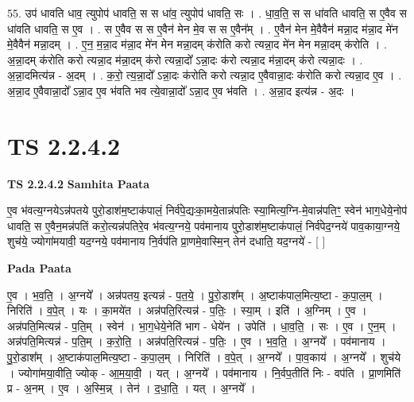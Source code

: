 \documentclass[17pt]{extarticle}
\begin{document}
55. उप॑ धावति धाव॒ त्युपोप॑ धावति॒ स स धा॑व॒ त्युपोप॑ धावति॒ सः । . धा॒व॒ति॒ स स धा॑वति धावति॒ स ए॒वैव स धा॑वति धावति॒ स ए॒व । . स ए॒वैव स स ए॒वैन॑ मेन मे॒व स स ए॒वैन᳚म् । . ए॒वैन॑ मेन मे॒वैवैन॑ मन्ना॒द म॑न्ना॒द मे॑न मे॒वैवैन॑ मन्ना॒दम् । . ए॒न॒ म॒न्ना॒द म॑न्ना॒द मे॑न मेन मन्ना॒दम् क॑रोति करो त्यन्ना॒द मे॑न मेन मन्ना॒दम् क॑रोति । . अ॒न्ना॒दम् क॑रोति करो त्यन्ना॒द म॑न्ना॒दम् क॑रो त्यन्ना॒दो᳚ ऽन्ना॒दः क॑रो त्यन्ना॒द म॑न्ना॒दम् क॑रो त्यन्ना॒दः । . अ॒न्ना॒दमित्य॑न्न - अ॒दम् । . क॒रो॒ त्य॒न्ना॒दो᳚ ऽन्ना॒दः क॑रोति करो त्यन्ना॒द ए॒वैवान्ना॒दः क॑रोति करो त्यन्ना॒द ए॒व । . अ॒न्ना॒द ए॒वैवान्ना॒दो᳚ ऽन्ना॒द ए॒व भ॑वति भव त्ये॒वान्ना॒दो᳚ ऽन्ना॒द ए॒व भ॑वति । . अ॒न्ना॒द इत्य॑न्न - अ॒दः । \newline
\pagebreak
{}
\section*{ TS 2.2.4.2 }

\textbf{TS 2.2.4.2 } \newline
\textbf{Samhita Paata} \newline

ए॒व भ॑वत्य॒ग्नयेऽन्न॑पतये पुरो॒डाश॑म॒ष्टाक॑पालं॒ निर्व॑पे॒द्यःका॒मये॒तान्न॑पतिः स्या॒मित्य॒ग्नि-मे॒वान्न॑पतिꣳ॒॒ स्वेन॑ भाग॒धेये॒नोप॑ धावति॒ स ए॒वैन॒मन्न॑पतिं करो॒त्यन्न॑पतिरे॒व भ॑वत्य॒ग्नये॒ पव॑मानाय पुरो॒डाश॑म॒ष्टाक॑पालं॒ निर्व॑पेद॒ग्नये॑ पाव॒काया॒ग्नये॒ शुच॑ये॒ ज्योगा॑मयावी॒ यद॒ग्नये॒ पव॑मानाय नि॒र्वप॑ति प्रा॒णमे॒वास्मि॒न् तेन॑ दधाति॒ यद॒ग्नये॑ - [  ] \newline

\textbf{Pada Paata} \newline

ए॒व । भ॒व॒ति॒ । अ॒ग्नये᳚ । अन्न॑पतय॒ इत्यन्न॑ - प॒त॒ये॒ । पु॒रो॒डाश᳚म् । अ॒ष्टाक॑पाल॒मित्य॒ष्टा - क॒पा॒ल॒म् । निरिति॑ । व॒पे॒त् । यः । का॒मये॑त । अन्न॑पति॒रित्यन्न॑ - प॒तिः॒ । स्या॒म् । इति॑ । अ॒ग्निम् । ए॒व । अन्न॑पति॒मित्यन्न॑ - प॒ति॒म् । स्वेन॑ । भा॒ग॒धेये॒नेति॑ भाग - धेये॑न । उपेति॑ । धा॒व॒ति॒ । सः । ए॒व । ए॒न॒म् । अन्न॑पति॒मित्यन्न॑ - प॒ति॒म् । क॒रो॒ति॒ । अन्न॑पति॒रित्यन्न॑ - प॒तिः॒ । ए॒व । भ॒व॒ति॒ । अ॒ग्नये᳚ । पव॑मानाय । पु॒रो॒डाश᳚म् । अ॒ष्टाक॑पाल॒मित्य॒ष्टा - क॒पा॒ल॒म् । निरिति॑ । व॒पे॒त् । अ॒ग्नये᳚ । पा॒व॒काय॑ । अ॒ग्नये᳚ । शुच॑ये । ज्योगा॑मया॒वीति॒ ज्योक् - आ॒म॒या॒वी॒ । यत् । अ॒ग्नये᳚ । पव॑मानाय । नि॒र्वप॒तीति॑ निः - वप॑ति । प्रा॒णमिति॑ प्र - अ॒नम् । ए॒व । अ॒स्मि॒न्न् । तेन॑ । द॒धा॒ति॒ । यत् । अ॒ग्नये᳚ ।  \newline
\end{document}
